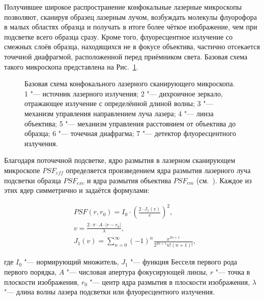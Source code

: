 Получившее широкое распространение конфокальные лазерные микроскопы позволяют, сканируя образец лазерным лучом, возбуждать молекулы флуорофора в малых областях образца и получать в итоге более чёткое изображение, чем  при подсветке всего образца сразу. Кроме того, флуоресцентное излучение со смежных слоёв образца, находящихся не в фокусе объектива, частично отсекается точечной диафрагмой, расположенной перед приёмником света. Базовая схема такого микроскопа представлена на Рис.~\ref{fig:scanning-microscope-scheme}.

\begin{figure}[ht]
	\caption{Базовая схема конфокального лазерного сканирующего микроскопа. 1 "--- источник лазерного излучения; 2 "--- дихроичное зеркало, отражающее излучение с определённой длиной волны; 3 "--- механизм управления направлением луча лазера; 4 "--- линза объектива; 5 "--- механизм управления расстоянием от объектива до образца; 6 "--- точечная диафрагма; 7 "--- детектор флуоресцентного излучения.}
	\label{fig:scanning-microscope-scheme}
\end{figure}


Благодаря поточечной подсветке, ядро размытия в лазерном сканирующем микроскопе $PSF_{eff}$ определяется произведением ядра размытия лазерного луча подсветки образца $PSF_{exc}$ и ядра размытия объектива $PSF_{em}$ (см.~\cite{weisshart2014basic}). Каждое из этих ядер симметрично и задаётся формулами:

\begin{align*}
	&PSF\left(r, r_0\right) = I_0 \cdot \left(\frac{2\cdot J_1\left(v\right)}{v}\right)^2, \\
	&v=\frac{2\cdot\pi\cdot A\cdot\left|r-r_0\right|}{\lambda}, \\
	&J_1(v)=\sum_{n=0}^{\infty}{\left(-1\right)^n\frac{x^{2n+1}}{2^{2n+1}n!\left(n+1\right)!}},
\end{align*}

\noindent где $I_0$ "--- нормирующий множитель, $J_1$ "--- функция Бесселя первого рода первого порядка, $A$ "--- числовая апертура фокусирующей линзы, $r$ "--- точка в плоскости изображения, $r_0$ "--- центр ядра размытия в плоскости изображения, $\lambda$ "--- длина волны лазера подсветки или флуоресцентного излучения.

